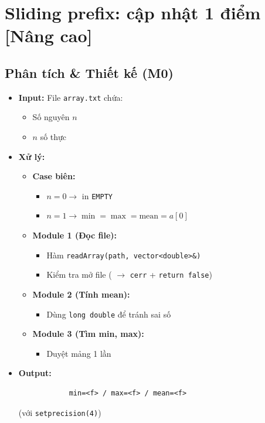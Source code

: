 \section{Sliding prefix: cập nhật 1 điểm [Nâng cao]}
\subsection{Phân tích \& Thiết kế (M0)}
    \begin{itemize}
    \item \textbf{Input:}
    File \texttt{array.txt} chứa:
    \begin{itemize}
        \item Số nguyên $n$
        \item $n$ số thực
    \end{itemize}

    \item \textbf{Xử lý:}
        \begin{itemize}
            \item \textbf{Case biên:}
            \begin{itemize}
                \item $n = 0 \rightarrow$ in \texttt{EMPTY}
                \item $n = 1 \rightarrow \min = \max = \text{mean} = a[0]$
            \end{itemize}
            
            \item \textbf{Module 1 (Đọc file):}
            \begin{itemize}
                \item Hàm \texttt{readArray(path, vector<double>\&)}
                \item Kiểm tra mở file ( $\rightarrow$ \texttt{cerr} + \texttt{return false})
            \end{itemize}
            
            \item \textbf{Module 2 (Tính mean):}
            \begin{itemize}
                \item Dùng \texttt{long double} để tránh sai số
            \end{itemize}
            
            \item \textbf{Module 3 (Tìm min, max):}
            \begin{itemize}
                \item Duyệt mảng 1 lần
            \end{itemize}
        \end{itemize}

        \item \textbf{Output:}
        \begin{lstlisting}
            min=<f> / max=<f> / mean=<f>\end{lstlisting} 
        (với \texttt{setprecision(4)})
    \end{itemize}

